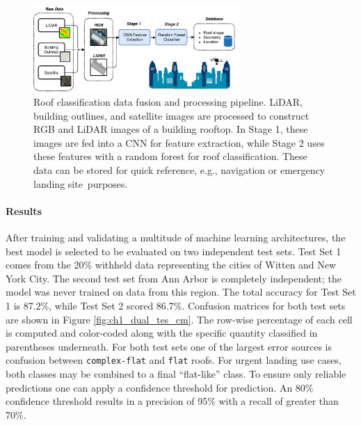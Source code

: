 \begin{figure}[ht]
\centering
\includegraphics[width=0.70\textwidth]{chapter_4_roofshape/imgs/overview_process.pdf}
\caption{Roof classification data fusion and processing pipeline. LiDAR, building outlines, and satellite images are processed to construct RGB and LiDAR images of a building rooftop. In Stage    1, these images are fed into a CNN for feature extraction, while Stage    2 uses these features with a random forest for roof classification. These data can be stored for quick reference, e.g., navigation or emergency landing site~purposes. }
\label{fig:outline_methods}
\end{figure}




\paragraph{Results}

After training and validating a multitude of machine learning architectures, the best model is selected to be evaluated on two independent test sets. Test Set 1 comes from the 20\% withheld data representing the cities of Witten and New York City. The second test set from Ann Arbor is completely independent; the model was never trained on data from this region. The total accuracy for Test Set 1 is 87.2\%, while Test Set 2  scored 86.7\%. Confusion matrices for both test sets are shown in Figure  \ref{fig:ch1_dual_tes_cm}. The row-wise percentage of each cell is computed and color-coded along with the specific quantity classified in parentheses underneath. For both test sets one of the largest error sources is confusion between \texttt{complex-flat} and \texttt{flat} roofs.
For urgent landing use cases, both classes may be combined to a final ``flat-like'' class. To ensure only reliable predictions one can apply a confidence threshold for prediction. An 80\% confidence threshold results in a precision of 95\% with a recall of greater than 70\%. 



